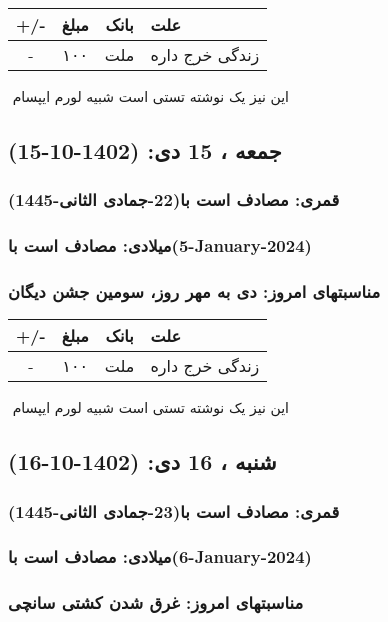 \documentclass{article}
\newcommand{\rnote}[1]{\marginpar{\textcolor{color}{\StrSubstitute{\##1}{ }{\_}}}}
\newcommand{\myRow}[4]{
    #1 & #2 & #3 & #4 \\ \hline
}
\begin{document}
\begin{tabular}{ | c | c | c | p{5cm} |}
    \hline
    \myRow{ +/- }{مبلغ}{بانک}{علت}
    \myRow{-}{۱۰۰}{ملت}{زندگی خرج داره}
\end{tabular}
\newline
\newline

‌
\rnote{تست}
این نیز یک نوشته تستی است شبیه لورم ایپسام




\newpage
{}
\textcolor{color}{
\section{ جمعه ، 15 دی: (1402-10-15) }
\subsubsection*{قمری: مصادف است با(22-جمادی الثانی-1445)} 
\subsubsection*{میلادی: مصادف است با(5-January-2024)}
\subsubsection*{مناسبتهای امروز: دی به مهر روز، سومین جشن دیگان}
}


\begin{tabular}{ | c | c | c | p{5cm} |}
    \hline
    \myRow{ +/- }{مبلغ}{بانک}{علت}
    \myRow{-}{۱۰۰}{ملت}{زندگی خرج داره}
\end{tabular}
\newline
\newline

‌
\rnote{تست}
این نیز یک نوشته تستی است شبیه لورم ایپسام




\newpage
{}
\textcolor{color}{
\section{ شنبه ، 16 دی: (1402-10-16) }
\subsubsection*{قمری: مصادف است با(23-جمادی الثانی-1445)} 
\subsubsection*{میلادی: مصادف است با(6-January-2024)}
\subsubsection*{مناسبتهای امروز: غرق شدن کشتی سانچی}
}
\end{document}
